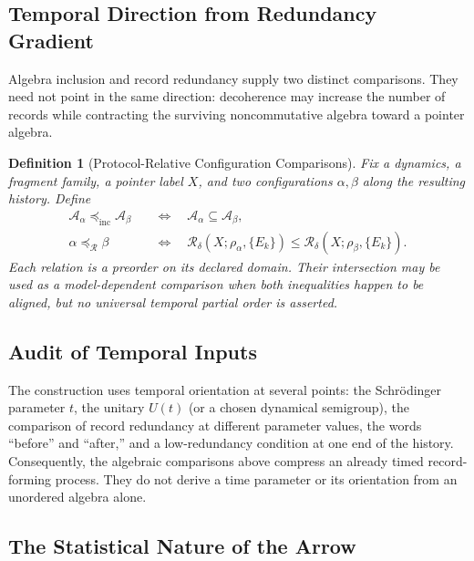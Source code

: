 \documentclass[12pt,a4paper,openany]{book}
\newtheorem{definition}[theorem]{Definition}
\begin{document}
\subsection{Temporal Direction from Redundancy Gradient}

Algebra inclusion and record redundancy supply two distinct comparisons.  They need not point in the same direction: decoherence may increase the number of records while contracting the surviving noncommutative algebra toward a pointer algebra.

\begin{definition}[Protocol-Relative Configuration Comparisons]
\label{H-F-def:ordering}
Fix a dynamics, a fragment family, a pointer label $X$, and two configurations $\alpha,\beta$ along the resulting history.  Define
\begin{equation}
\begin{aligned}
\mathcal{A}_\alpha \preceq_{\mathrm{inc}} \mathcal{A}_\beta
&\quad\Longleftrightarrow\quad
\mathcal{A}_\alpha\subseteq\mathcal{A}_\beta,\\
\alpha\preceq_{\mathcal R}\beta
&\quad\Longleftrightarrow\quad
\mathcal R_\delta(X;\rho_\alpha,\{E_k\})
\leq \mathcal R_\delta(X;\rho_\beta,\{E_k\}).
\end{aligned}
\end{equation}
Each relation is a preorder on its declared domain.  Their intersection may be used as a model-dependent comparison when both inequalities happen to be aligned, but no universal temporal partial order is asserted.
\end{definition}

\subsection{Audit of Temporal Inputs}

The construction uses temporal orientation at several points: the Schr\"odinger parameter $t$, the unitary $U(t)$ (or a chosen dynamical semigroup), the comparison of record redundancy at different parameter values, the words ``before'' and ``after,'' and a low-redundancy condition at one end of the history.  Consequently, the algebraic comparisons above compress an already timed record-forming process.  They do not derive a time parameter or its orientation from an unordered algebra alone.

\subsection{The Statistical Nature of the Arrow}
\end{document}
